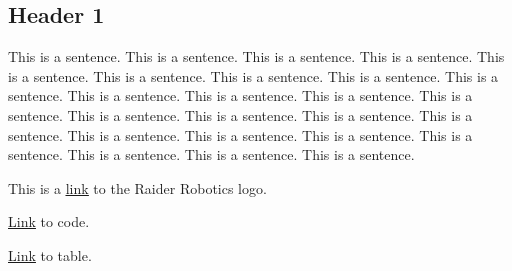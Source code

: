 \label{019dffd4-962e-7592-bd30-e149e383e130}

\subsection{Header 1}

This is a sentence. This is a sentence. This is a sentence. This is a sentence. This is a sentence. This is a sentence. This is a sentence. This is a sentence. This is a sentence. This is a sentence. This is a sentence. This is a sentence. This is a sentence. This is a sentence. This is a sentence. This is a sentence. This is a sentence. This is a sentence. This is a sentence. This is a sentence. This is a sentence. This is a sentence. This is a sentence. This is a sentence.

This is a \underline{\hyperref[019dffd4-962e-71e8-a39f-6e23a842592e]{link}} to the Raider Robotics logo.

\underline{\hyperref[019dffd4-962e-75ff-b600-7a1a9a2a9de1]{Link}} to code.

\underline{\hyperref[019dffd4-962e-7fe6-9686-9b155d88c62c]{Link}} to table.
